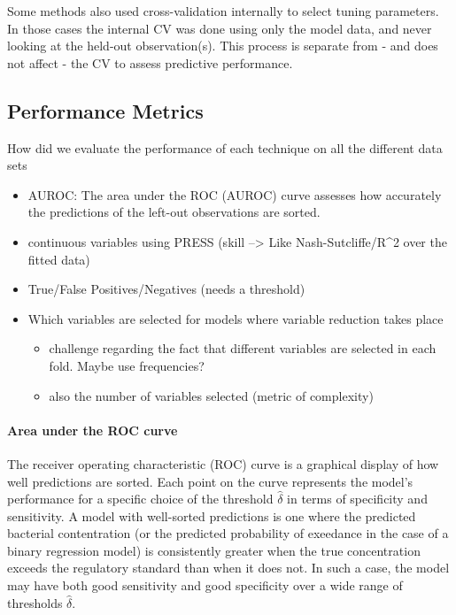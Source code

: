 \documentclass[english]{article}\usepackage[]{graphicx}\usepackage[]{color}
\numberwithin{equation}{section}
\numberwithin{figure}{section}
\renewcommand\[{\begin{equation}}
\renewcommand\]{\end{equation}}
\begin{document}
Some methods also used cross-validation internally to select tuning
parameters. In those cases the internal CV was done using only the
model data, and never looking at the held-out observation(s). This
process is separate from - and does not affect - the CV to assess
predictive performance.


\subsection{Performance Metrics}

How did we evaluate the performance of each technique on all the different
data sets
\begin{itemize}
\item AUROC: The area under the ROC (AUROC) curve assesses how accurately
the predictions of the left-out observations are sorted. 
\item continuous variables using PRESS (skill --> Like Nash-Sutcliffe/R\textasciicircum{}2
over the fitted data) 
\item True/False Positives/Negatives (needs a threshold)
\item Which variables are selected for models where variable reduction takes
place

\begin{itemize}
\item challenge regarding the fact that different variables are selected
in each fold. Maybe use frequencies?
\item also the number of variables selected (metric of complexity)
\end{itemize}
\end{itemize}

\paragraph*{Area under the ROC curve}

The receiver operating characteristic (ROC) curve is a graphical display
of how well predictions are sorted. Each point on the curve represents
the model's performance for a specific choice of the threshold $\hat{\delta}$
in terms of specificity and sensitivity. A model with well-sorted
predictions is one where the predicted bacterial contentration (or
the predicted probability of exeedance in the case of a binary regression
model) is consistently greater when the true concentration exceeds
the regulatory standard than when it does not. In such a case, the
model may have both good sensitivity and good specificity over a wide
range of thresholds $\hat{\delta}$.
\end{document}
